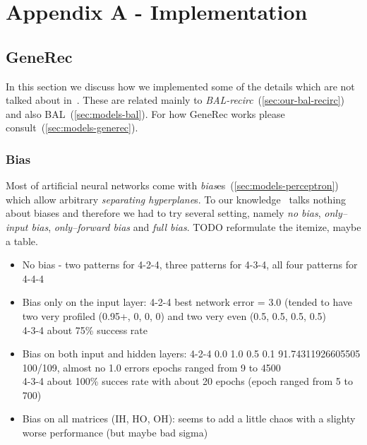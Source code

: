 
\section*{Appendix A - Implementation}
\appendix
{}
\label{sec:appendix-impl} 


\subsection*{GeneRec} 
\label{sec:appendix-impl-generec} 

In this section we discuss how we implemented some of the details which are not talked about in~\citet{o1996bio}. These are related mainly to \emph{BAL-recirc}~(\ref{sec:our-bal-recirc}) and also BAL~(\ref{sec:models-bal}). For how GeneRec works please consult~(\ref{sec:models-generec}).  

\subsubsection*{Bias} 

Most of artificial neural networks come with \emph{bias}es~(\ref{sec:models-perceptron}) which allow arbitrary \emph{separating hyperplane}s. To our knowledge~\citet{o1996bio} talks nothing about biases and therefore we had to try several setting, namely \emph{no bias}, \emph{only--input bias}, \emph{only--forward bias} and \emph{full bias}. TODO reformulate the itemize, maybe a table. 

\begin{itemize} 
\item No bias - two patterns for 4-2-4, three patterns for 4-3-4, all four patterns for 4-4-4
\item Bias only on the input layer:  
4-2-4 best network error = 3.0 (tended to have two very profiled (0.95+, 0, 0, 0) and two very even (0.5, 0.5, 0.5, 0.5)  \\
4-3-4 about 75\% success rate 
\item Bias on both input and hidden layers: 
    4-2-4 0.0 1.0 0.5 0.1 91.74311926605505 100/109, almost no 1.0 errors 
          epochs ranged from 9 to 4500 \\ 
    4-3-4 about 100\% succes rate with about 20 epochs (epoch ranged from 5 to 700) 
\item Bias on all matrices (IH, HO, OH): 
    seems to add a little chaos with a slighty worse performance (but maybe bad sigma)

\end{itemize} 

